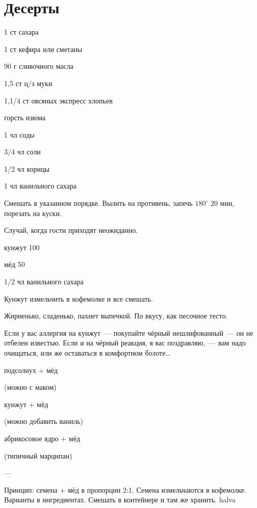 \chapter*{Десерты}
\label{sec:sweet}



{
\item 1 ст сахара
\item 1 ст кефира или сметаны
\item 90 г сливочного масла
\item 1,5 ст ц/з муки
\item 1,1/4 ст овсяных экспресс хлопьев %
\item горсть изюма
}{
\item 1 чл соды
\item 3/4 чл соли
\item 1/2 чл корицы
\item 1 чл ванильного сахара
}{
Смешать в указанном порядке. Вылить на противень, запечь $180^{\circ}$ 20 мин, порезать на куски.
}{
\begin{advice}
\item Случай, когда гости приходят неожиданно.
\end{advice}}{}



{\label{cookies}
\item кунжут 100 
\item мёд 50
}{
\item 1/2 чл ванильного сахара
}{
Кунжут измельчить в кофемолке и все смешать.
}{
\begin{advice}
    \item  Жирненько, сладенько, пахнет выпечкой. По вкусу, как песочное тесто.
\item Если у вас аллергия на кунжут~--- покупайте чёрный нешлифованный~— он не отбелен известью. Если и на чёрный реакция, я вас поздравляю,~— вам надо очищаться, или же оставаться в комфортном болоте\ldots

\end{advice}}{}



{


\item подсолнух + мёд

    (можно с маком)
\item кунжут + мёд 

    (можно добавить ваниль)
\item абрикосовое ядро + мёд 

    (типичный марципан)

}{
\item ---
}{
Принцип: семена + мёд в пропорции 2:1. Семена измельчаются в кофемолке. Варианты в ингредиентах.
Смешать в контейнере и там же хранить.
}{}{halva}



